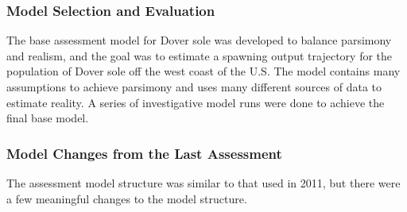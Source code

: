 \documentclass[11pt,
  english,
  a4paper,
]{article}
\begin{document}
\leavevmode\tagmcend\tagstructend\par


\hypertarget{model-selection-and-evaluation}{%
\subsubsection{Model Selection and Evaluation}\label{model-selection-and-evaluation}}

\leavevmode\tagmcend\tagstructend


The base assessment model for Dover sole was developed to balance parsimony and realism, and the goal was to estimate a spawning output trajectory for the population of Dover sole off the west coast of the U.S. The model contains many assumptions to achieve parsimony and uses many different sources of data to estimate reality. A series of investigative model runs were done to achieve the final base model.

\leavevmode\tagmcend\tagstructend\par


\hypertarget{model-changes-from-the-last-assessment}{%
\subsubsection{Model Changes from the Last Assessment}\label{model-changes-from-the-last-assessment}}

\leavevmode\tagmcend\tagstructend


The assessment model structure was similar to that used in 2011, but there were a few meaningful changes to the model structure.

\leavevmode\tagmcend\tagstructend\par

\end{document}
